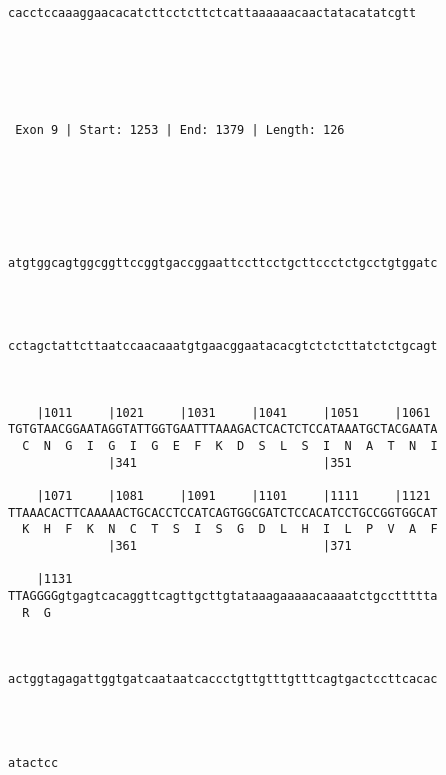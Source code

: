 \documentclass{article}
\begin{document}
\begin{Verbatim}
                                                            
   
                                                         
cacctccaaaggaacacatcttcctcttctcattaaaaaacaactatacatatcgtt
                                                         
                                                         
  



 Exon 9 | Start: 1253 | End: 1379 | Length: 126 





   
                                                            
atgtggcagtggcggttccggtgaccggaattccttcctgcttccctctgcctgtggatc
                                                            
                                                            
   
                                                            
cctagctattcttaatccaacaaatgtgaacggaatacacgtctctcttatctctgcagt
                                                            
                                                            
   
    |1011     |1021     |1031     |1041     |1051     |1061 
TGTGTAACGGAATAGGTATTGGTGAATTTAAAGACTCACTCTCCATAAATGCTACGAATA
  C  N  G  I  G  I  G  E  F  K  D  S  L  S  I  N  A  T  N  I
              |341                          |351            
   
    |1071     |1081     |1091     |1101     |1111     |1121 
TTAAACACTTCAAAAACTGCACCTCCATCAGTGGCGATCTCCACATCCTGCCGGTGGCAT
  K  H  F  K  N  C  T  S  I  S  G  D  L  H  I  L  P  V  A  F
              |361                          |371            
   
    |1131                                                   
TTAGGGGgtgagtcacaggttcagttgcttgtataaagaaaaacaaaatctgccttttta
  R  G                                                      
                                                            
   
                                                            
actggtagagattggtgatcaataatcaccctgttgtttgtttcagtgactccttcacac
                                                            
                                                            
   
       
atactcc
       

\end{Verbatim}
\end{document}

